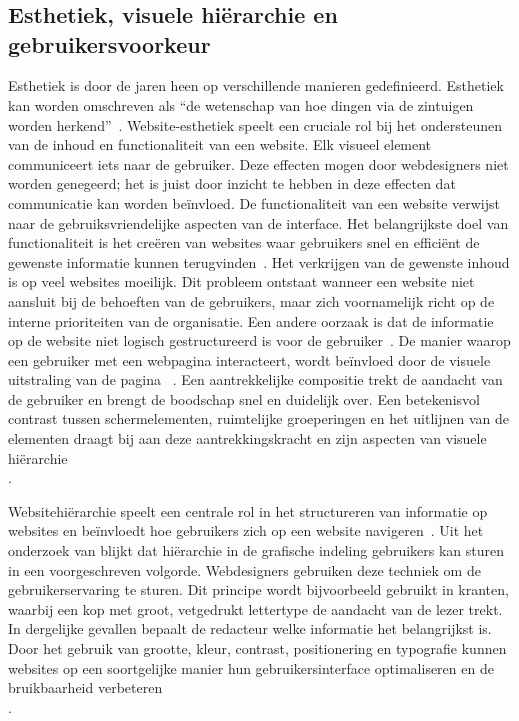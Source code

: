\chapter{}%
\label{ch:stand-van-zaken}
\section [Esthetiek, hiërarchie en voorkeur]{Esthetiek, visuele hiërarchie en\\gebruikersvoorkeur}
Esthetiek is door de jaren heen op verschillende manieren gedefinieerd. Esthetiek kan worden omschreven als “de wetenschap van hoe dingen via de zintuigen worden herkend”~\autocite[p.~12]{Noponen2017}. Website-esthetiek speelt een cruciale rol bij het ondersteunen van de inhoud en functionaliteit van een website. Elk visueel element communiceert iets naar de gebruiker. Deze effecten mogen door webdesigners niet worden genegeerd; het is juist door inzicht te hebben in deze effecten dat communicatie kan worden beïnvloed. 
De functionaliteit van een website verwijst naar de gebruiksvriendelijke aspecten van de interface. Het belangrijkste doel van functionaliteit is het creëren van websites waar gebruikers snel en efficiënt de gewenste informatie kunnen terugvinden~\autocite{Thorlacius2007}. Het verkrijgen van de gewenste inhoud is op veel websites moeilijk. Dit probleem ontstaat wanneer een website niet aansluit bij de behoeften van de gebruikers, maar zich voornamelijk richt op de interne prioriteiten van de organisatie. Een andere oorzaak is dat de informatie op de website niet logisch gestructureerd is voor de gebruiker~\autocite{Bevan1997}.
De manier waarop een gebruiker met een webpagina interacteert, wordt beïnvloed door de visuele uitstraling van de pagina ~\autocite{Michailidou2008}. Een aantrekkelijke compositie trekt de aandacht van de gebruiker en brengt de boodschap snel en duidelijk over. Een betekenisvol contrast tussen schermelementen, ruimtelijke groeperingen en het uitlijnen van de elementen draagt bij aan deze aantrekkingskracht en zijn aspecten van visuele hiërarchie\\ \autocite{Bhaskar2011}.

Websitehiërarchie speelt een centrale rol in het structureren van informatie op websites en beïnvloedt hoe gebruikers zich op een website navigeren~\autocite{Djonov2007}. Uit het onderzoek van \textcite{Urano2021} blijkt dat hiërarchie in de grafische indeling gebruikers kan sturen in een voorgeschreven volgorde. Webdesigners gebruiken deze techniek om de gebruikerservaring te sturen. Dit principe wordt bijvoorbeeld gebruikt in kranten, waarbij een kop met groot, vetgedrukt lettertype de aandacht van de lezer trekt. In dergelijke gevallen bepaalt de redacteur welke informatie het belangrijkst is. Door het gebruik van grootte, kleur, contrast, positionering en typografie kunnen websites op een soortgelijke manier hun gebruikersinterface optimaliseren en de bruikbaarheid verbeteren\\\autocite{Raghavendra2024}.

